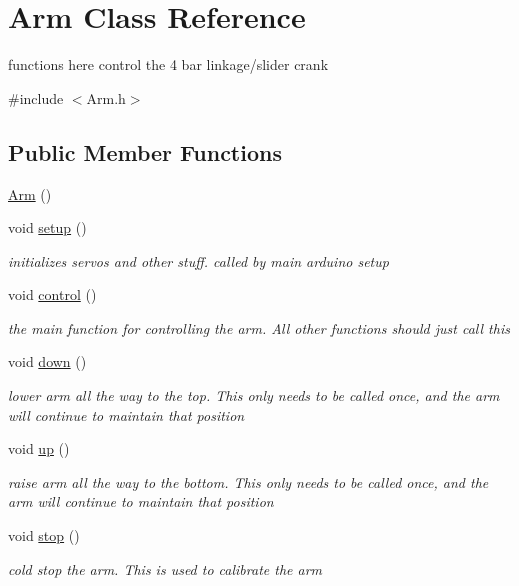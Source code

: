 \hypertarget{classArm}{\section{Arm Class Reference}
\label{classArm}
}


functions here control the 4 bar linkage/slider crank  




{\ttfamily \#include $<$Arm.\-h$>$}

\subsection*{Public Member Functions}
\begin{DoxyCompactItemize}
\item 
\hyperlink{classArm_a920d0f828c6e76188827cf0c073963de}{Arm} ()
\item 
void \hyperlink{classArm_a0e642e1a6fc24f40268f2c759dee62e1}{setup} ()
\begin{DoxyCompactList}\small\item\em initializes servos and other stuff. called by main arduino setup \end{DoxyCompactList}\item 
void \hyperlink{classArm_a009c19e5b213f692c24eab792cc40c47}{control} ()
\begin{DoxyCompactList}\small\item\em the main function for controlling the arm. All other functions should just call this \end{DoxyCompactList}\item 
void \hyperlink{classArm_a9075166ca53ef3cd547a7725ee5bca1d}{down} ()
\begin{DoxyCompactList}\small\item\em lower arm all the way to the top. This only needs to be called once, and the arm will continue to maintain that position \end{DoxyCompactList}\item 
void \hyperlink{classArm_a65ffd463407a6782a55dbd5b84f1e15e}{up} ()
\begin{DoxyCompactList}\small\item\em raise arm all the way to the bottom. This only needs to be called once, and the arm will continue to maintain that position \end{DoxyCompactList}\item 
void \hyperlink{classArm_a4a8274680d981524efbeb2b51eb49c28}{stop} ()
\begin{DoxyCompactList}\small\item\em cold stop the arm. This is used to calibrate the arm \end{DoxyCompactList}\item 

\end{DoxyCompactItemize}
